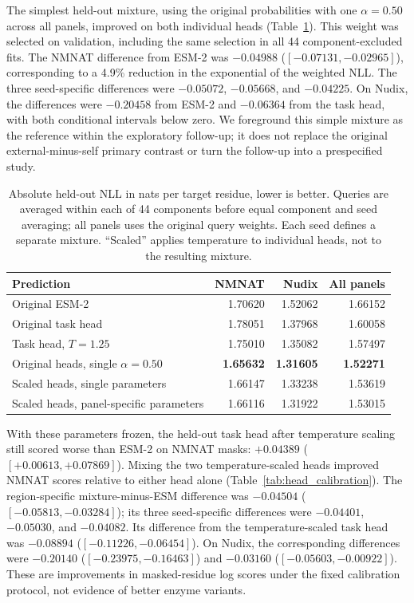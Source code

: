 \documentclass[referee,pdflatex,sn-vancouver-num]{sn-jnl}
\begin{document}
The simplest held-out mixture, using the original probabilities with one $\alpha=0.50$ across all panels, improved on both individual heads (Table~\ref{tab:raw_mixture}). This weight was selected on validation, including the same selection in all 44 component-excluded fits. The NMNAT difference from ESM-2 was $-0.04988$ ($[-0.07131,-0.02965]$), corresponding to a 4.9\% reduction in the exponential of the weighted NLL. The three seed-specific differences were $-0.05072$, $-0.05668$, and $-0.04225$. On Nudix, the differences were $-0.20458$ from ESM-2 and $-0.06364$ from the task head, with both conditional intervals below zero. We foreground this simple mixture as the reference within the exploratory follow-up; it does not replace the original external-minus-self primary contrast or turn the follow-up into a prespecified study.

\begin{table}[ht]
\centering\small
\caption{Absolute held-out NLL in nats per target residue, lower is better. Queries are averaged within each of 44 components before equal component and seed averaging; all panels uses the original query weights. Each seed defines a separate mixture. ``Scaled'' applies temperature to individual heads, not to the resulting mixture.}\label{tab:raw_mixture}
\begin{tabular}{lrrr}
\toprule
Prediction & NMNAT & Nudix & All panels \\
\midrule
Original ESM-2 & 1.70620 & 1.52062 & 1.66152 \\
Original task head & 1.78051 & 1.37968 & 1.60058 \\
Task head, $T=1.25$ & 1.75010 & 1.35082 & 1.57497 \\
Original heads, single $\alpha=0.50$ & \textbf{1.65632} & \textbf{1.31605} & \textbf{1.52271} \\
Scaled heads, single parameters & 1.66147 & 1.33238 & 1.53619 \\
Scaled heads, panel-specific parameters & 1.66116 & 1.31922 & 1.53015 \\
\bottomrule
\end{tabular}
\end{table}

With these parameters frozen, the held-out task head after temperature scaling still scored worse than ESM-2 on NMNAT masks: $+0.04389$ ($[+0.00613,+0.07869]$). Mixing the two temperature-scaled heads improved NMNAT scores relative to either head alone (Table~\ref{tab:head_calibration}). The region-specific mixture-minus-ESM difference was $-0.04504$ ($[-0.05813,-0.03284]$); its three seed-specific differences were $-0.04401$, $-0.05030$, and $-0.04082$. Its difference from the temperature-scaled task head was $-0.08894$ ($[-0.11226,-0.06454]$). On Nudix, the corresponding differences were $-0.20140$ ($[-0.23975,-0.16463]$) and $-0.03160$ ($[-0.05603,-0.00922]$). These are improvements in masked-residue log scores under the fixed calibration protocol, not evidence of better enzyme variants.
\end{document}
